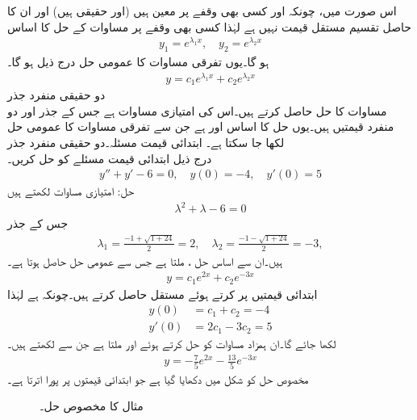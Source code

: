 اس صورت میں، چونکہ  اور  کسی بھی وقفے  پر معین ہیں (اور حقیقی ہیں)  اور ان کا حاصل تقسیم مستقل قیمت نہیں ہے لہٰذا کسی بھی وقفے  پر مساوات  کے حل کا اساس
\begin{align}
y_1=e^{\lambda_1 x}, \quad y_2=e^{\lambda_2 x}
\end{align}
ہو گا۔یوں تفرقی مساوات کا عمومی حل درج ذیل ہو گا۔
\begin{align}
y=c_1e^{\lambda_1 x}+c_2 e^{\lambda_2 x}
\end{align}
\quad دو حقیقی منفرد جذر\\
مساوات  کا حل حاصل کرتے ہیں۔اس کی امتیازی مساوات  ہے جس کے جذر  اور   دو منفرد قیمتیں ہیں۔یوں حل کا اساس  اور  ہے جن سے تفرقی مساوات کا عمومی حل  لکھا جا سکتا ہے۔
\quad ابتدائی قیمت مسئلہ۔دو حقیقی منفرد جذر\\
درج ذیل ابتدائی قیمت مسئلے کو حل کریں۔
\begin{align*}
y''+y'-6=0,\quad y(0)=-4, \quad y'(0)=5
\end{align*} 
حل: امتیازی مساوات لکھتے ہیں
\begin{align*}
\lambda^2+\lambda-6=0
\end{align*}
جس کے جذر
\begin{align*}
\lambda_1=\frac{-1+\sqrt{1+24}}{2}=2, \quad \lambda_2=\frac{-1-\sqrt{1+24}}{2}=-3,
\end{align*}
ہیں۔ان سے اساس حل ،  ملتا ہے جس سے عمومی حل حاصل ہوتا ہے۔
\begin{align*}
y=c_1e^{2x}+c_2e^{-3x}
\end{align*}
ابتدائی قیمتیں پر کرتے ہوئے مستقل حاصل کرتے ہیں۔چونکہ  ہے لہٰذا
\begin{align*}
y(0)&=c_1+c_2=-4\\
y'(0)&=2c_1-3c_2=5
\end{align*}
لکھا جائے گا۔ان ہمزاد مساوات کو حل کرتے ہوئے  اور  ملتا ہے جن سے  لکھتے ہیں۔
 \begin{align*}
y=-\frac{7}{5}e^{2x}-\frac{13}{5}e^{-3x}
\end{align*}
مخصوص حل کو شکل  میں دکھایا گیا ہے جو ابتدائی قیمتوں پر پورا اترتا ہے۔
%
\begin{figure}
\centering
{}
\caption{مثال  کا مخصوص حل۔}
\label{شکل_مثال_سادہ_دو_درجی_حقیقی_منفرد_جذر_الف}
\end{figure}

